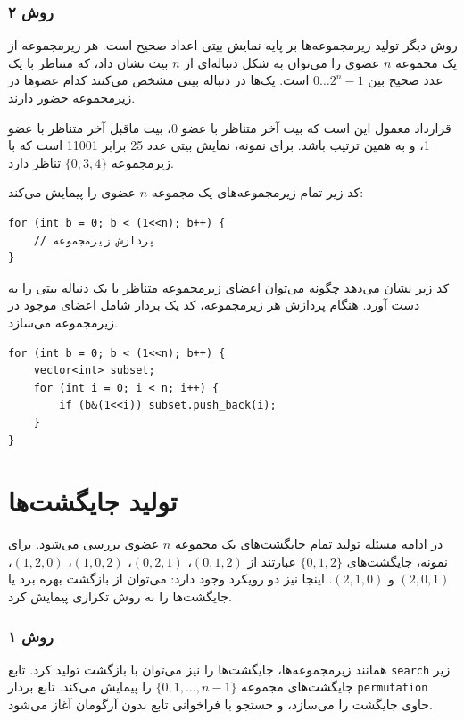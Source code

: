 \subsubsection{روش ۲}

روش دیگر تولید زیرمجموعه‌ها بر پایه نمایش بیتی اعداد صحیح است.
هر زیرمجموعه از یک مجموعه $n$ عضوی را می‌توان به شکل دنباله‌ای از $n$ بیت نشان داد،
که متناظر با یک عدد صحیح بین $0 \ldots 2^n-1$ است.
یک‌ها در دنباله بیتی مشخص می‌کنند کدام عضوها در زیرمجموعه حضور دارند.

قرارداد معمول این است که
بیت آخر متناظر با عضو 0،
بیت ماقبل آخر متناظر با عضو 1،
و به همین ترتیب باشد.
برای نمونه، نمایش بیتی عدد 25
برابر 11001 است که با زیرمجموعه $\{0,3,4\}$ تناظر دارد.

کد زیر تمام زیرمجموعه‌های یک مجموعه $n$ عضوی را پیمایش می‌کند:

\begin{lstlisting}
for (int b = 0; b < (1<<n); b++) {
    // پردازش زیرمجموعه
}
\end{lstlisting}

کد زیر نشان می‌دهد چگونه می‌توان اعضای زیرمجموعه متناظر با یک دنباله بیتی را به دست آورد.
هنگام پردازش هر زیرمجموعه،
کد یک بردار شامل اعضای موجود در زیرمجموعه می‌سازد.

\begin{lstlisting}
for (int b = 0; b < (1<<n); b++) {
    vector<int> subset;
    for (int i = 0; i < n; i++) {
        if (b&(1<<i)) subset.push_back(i);
    }
}
\end{lstlisting}

\section{تولید جایگشت‌ها}


در ادامه مسئله تولید تمام جایگشت‌های یک مجموعه $n$ عضوی بررسی می‌شود.
برای نمونه، جایگشت‌های $\{0,1,2\}$ عبارتند از
$(0,1,2)$، $(0,2,1)$، $(1,0,2)$، $(1,2,0)$،
$(2,0,1)$ و $(2,1,0)$.
اینجا نیز دو رویکرد وجود دارد:
می‌توان از بازگشت بهره برد یا جایگشت‌ها را به روش تکراری پیمایش کرد.

\subsubsection{روش ۱}

همانند زیرمجموعه‌ها، جایگشت‌ها را نیز می‌توان با بازگشت تولید کرد.
تابع \texttt{search} زیر
جایگشت‌های مجموعه $\{0,1,\ldots,n-1\}$ را پیمایش می‌کند.
تابع بردار \texttt{permutation} حاوی جایگشت را می‌سازد،
و جستجو با فراخوانی تابع بدون آرگومان آغاز می‌شود.

